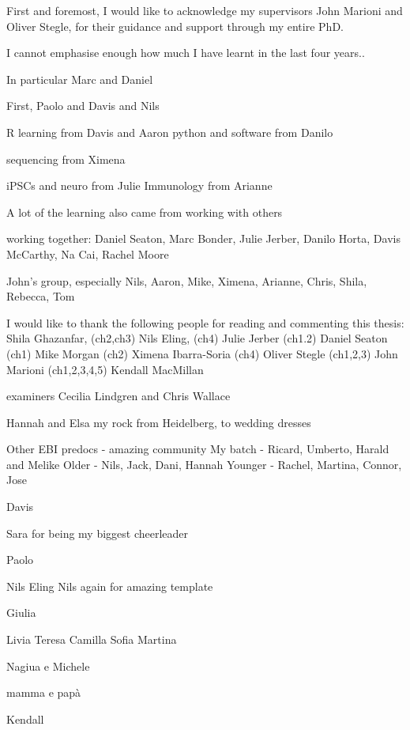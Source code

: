 
\begin{acknowledgements}      


First and foremost, I would like to acknowledge my supervisors John Marioni and Oliver Stegle, for their guidance and support through my entire PhD.

I cannot emphasise enough how much I have learnt in the last four years..

In particular Marc and Daniel

First, Paolo
and Davis
and Nils

R learning from Davis and Aaron
python and software from Danilo

sequencing from Ximena

iPSCs and neuro from Julie
Immunology from Arianne

A lot of the learning also came from working with others

working together: Daniel Seaton, Marc Bonder, Julie Jerber, Danilo Horta, Davis McCarthy, Na Cai, Rachel Moore

John's group, especially Nils, Aaron, Mike, Ximena, Arianne, Chris, Shila, Rebecca, Tom

I would like to thank the following people for reading and commenting this thesis: 
Shila Ghazanfar, (ch2,ch3)
Nils Eling, (ch4)
Julie Jerber  (ch1.2)
Daniel Seaton (ch1)
Mike Morgan (ch2)
Ximena Ibarra-Soria (ch4)
Oliver Stegle (ch1,2,3)
John Marioni (ch1,2,3,4,5)
Kendall MacMillan

examiners 
Cecilia Lindgren and Chris Wallace

Hannah and Elsa my rock
from Heidelberg, to wedding dresses

Other EBI predocs - amazing community
My batch - Ricard, Umberto, Harald and Melike
Older - Nils, Jack, Dani, Hannah
Younger - Rachel, Martina, Connor, Jose

Davis 

Sara for being my biggest cheerleader

Paolo

Nils Eling
Nils again for amazing template

Giulia

Livia Teresa Camilla Sofia Martina

Nagiua e Michele

mamma e papà

Kendall

\end{acknowledgements}

